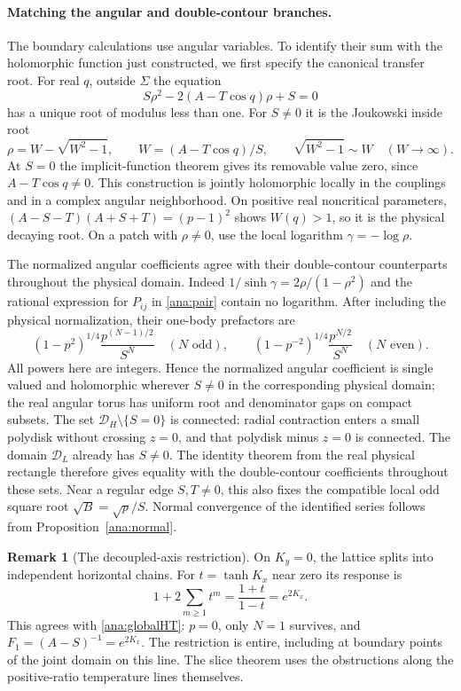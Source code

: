 \documentclass[11pt]{article}
\numberwithin{equation}{section}
\theoremstyle{definition}
\newtheorem{remark}[theorem]{Remark}
\renewcommand{\DH}{\mathcal D_H}
\newcommand{\DL}{\mathcal D_L}
\begin{document}
\paragraph{Matching the angular and double-contour branches.}
The boundary calculations use angular variables. To identify their
sum with the holomorphic function just constructed, we first specify
the canonical transfer root.
For real \(q\), outside \(\Sigma\) the equation
\[
 S\rho^2-2(A-T\cos q)\rho+S=0
\]
has a unique root of modulus less than one. For \(S\ne0\) it is the
Joukowski inside root
\[
 \rho=W-\sqrt{W^2-1},\qquad W=(A-T\cos q)/S,
 \qquad \sqrt{W^2-1}\sim W\quad(W\longrightarrow\infty).
\]
At \(S=0\) the implicit-function theorem gives its removable value
zero, since \(A-T\cos q\ne0\). This construction is jointly
holomorphic locally in the couplings and in a complex angular
neighborhood. On positive real noncritical parameters,
\((A-S-T)(A+S+T)=(p-1)^2\) shows \(W(q)>1\), so it is the
physical decaying root. On a patch with \(\rho\ne0\), use the local
logarithm \(\gamma=-\log\rho\).

The normalized angular coefficients agree with their double-contour
counterparts throughout the physical domain. Indeed
\(1/\sinh\gamma=2\rho/(1-\rho^2)\) and the rational expression
for \(P_{ij}\) in \eqref{ana:pair} contain no logarithm. After
including the physical normalization, their one-body prefactors are
\[
 (1-p^2)^{1/4}\frac{p^{(N-1)/2}}{S^N}
 \quad(N\text{ odd}),\qquad
 (1-p^{-2})^{1/4}\frac{p^{N/2}}{S^N}
 \quad(N\text{ even}).
\]
All powers here are integers. Hence the normalized angular coefficient
is single valued and holomorphic wherever \(S\ne0\) in the
corresponding physical domain; the real angular torus has uniform
root and denominator gaps on compact subsets. The set
\(\DH\setminus\{S=0\}\) is connected: radial contraction enters
a small polydisk without crossing \(z=0\), and that polydisk minus
\(z=0\) is connected. The domain \(\DL\) already has \(S\ne0\).
The identity theorem from the real physical rectangle therefore gives
equality with the double-contour coefficients throughout these sets.
Near a regular edge \(S,T\ne0\), this also fixes the compatible
local odd square root \(\sqrt B=\sqrt p/S\). Normal convergence
of the identified series follows from Proposition~\ref{ana:normal}.

\begin{remark}[The decoupled-axis restriction]\label{ana:axis}
On \(K_y=0\), the lattice splits into independent horizontal chains.
For \(t=\tanh K_x\) near zero its response is
\[
 1+2\sum_{m\ge1}t^m=\frac{1+t}{1-t}=e^{2K_x}.
\]
This agrees with \eqref{ana:globalHT}: \(p=0\), only \(N=1\)
survives, and \(F_1=(A-S)^{-1}=e^{2K_x}\).
The restriction is entire, including at boundary points of the
joint domain on this line. The slice theorem uses the obstructions
along the positive-ratio temperature lines themselves.
\end{remark}
\end{document}
